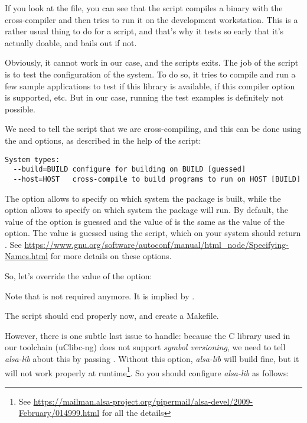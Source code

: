 If you look at the  file, you can see that the
 script compiles a binary with the cross-compiler
and then tries to run it on the development workstation. This is a
rather usual thing to do for a  script, and that's
why it tests so early that it's actually doable, and bails out if not.

Obviously, it cannot work in our case, and the scripts exits. The job
of the  script is to test the configuration of the system. To
do so, it tries to compile and run a few sample applications to test
if this library is available, if this compiler option is supported,
etc. But in our case, running the test examples is definitely not
possible.

We need to tell the  script that we are cross-compiling, and
this can be done using the  and  options,
as described in the help of the  script:

\begin{verbatim}
System types:
  --build=BUILD	configure for building on BUILD [guessed]
  --host=HOST	cross-compile to build programs to run on HOST [BUILD]
\end{verbatim}

The  option allows to specify on which system the
package is built, while the  option allows to specify on
which system the package will run. By default, the value of the
 option is guessed and the value of  is the
same as the value of the  option. The value is guessed
using the  script, which on your system should
return . See
\url{https://www.gnu.org/software/autoconf/manual/html_node/Specifying-Names.html}
for more details on these options.

So, let's override the value of the  option:


Note that  is not required anymore. It is implied
by .

The  script should end properly now, and create a
Makefile.

However, there is one subtle last issue to handle: because the C
library used in our toolchain (uClibc-ng) does not support {\em symbol
versioning}, we need to tell {\em alsa-lib} about this by passing
. Without this option, {\em alsa-lib} will
build fine, but it will not work properly at runtime\footnote{See
\url{https://mailman.alsa-project.org/pipermail/alsa-devel/2009-February/014999.html}
for all the details}. So you should configure {\em alsa-lib} as
follows:

